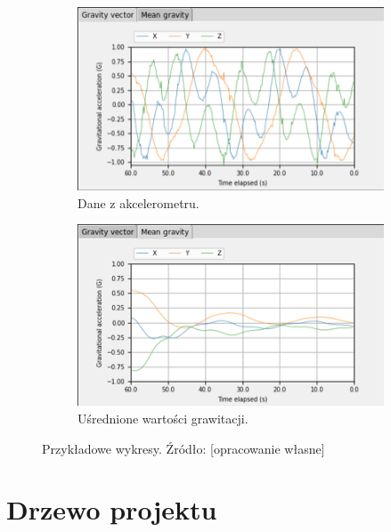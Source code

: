 \begin{figure}[h]
	\centering
	
	\begin{subfigure}[h]{.49\textwidth}
		\centering
		\includegraphics[scale=1.7]{grav_surowe}
		\caption{Dane z akcelerometru.}
		\label{fig:grav_raw}
	\end{subfigure}
	\hfill%
	\begin{subfigure}[h]{.49\textwidth}
		\centering
		\includegraphics[scale=1.7]{grav_sr}
		\caption{Uśrednione wartości grawitacji.} 
		\label{fig:grav_mean}
	\end{subfigure}
	
	\caption{Przykładowe wykresy. Źródło: [opracowanie własne]}
	\label{fig:wykresy_gui}
	
\end{figure}

\section{Drzewo projektu}

